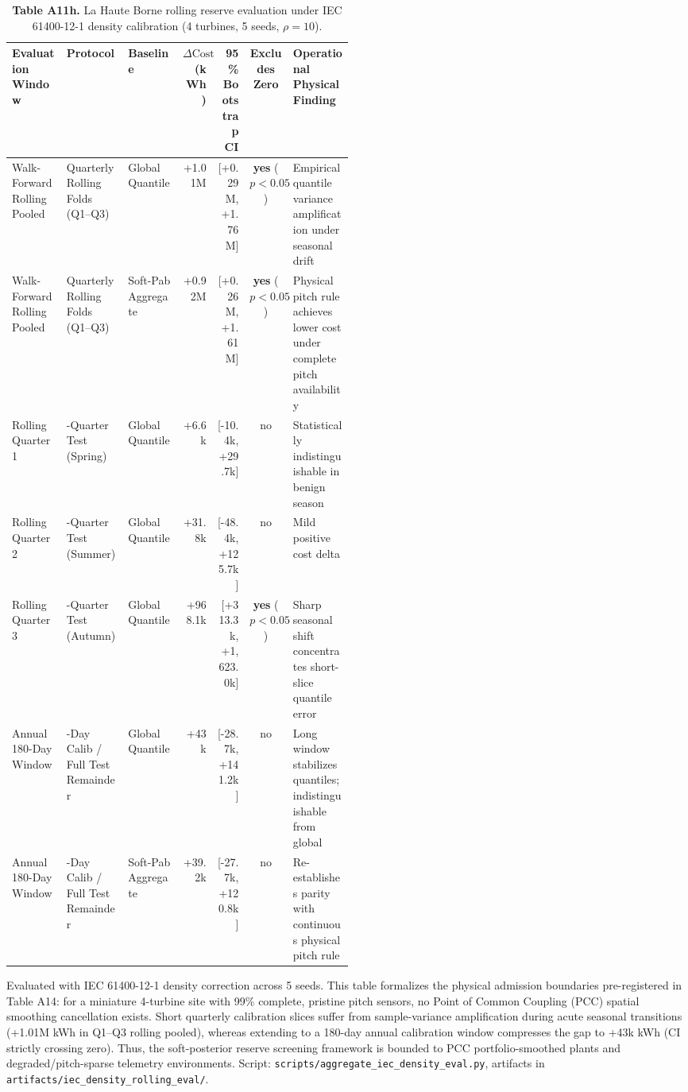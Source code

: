 \documentclass[
  journal]{IEEEtran}
\begin{document}
\begin{table}[!t]
\centering
\fontsize{8.0pt}{9.6pt}\selectfont
\setlength{\tabcolsep}{2.0pt}
\renewcommand{\arraystretch}{1.05}
\caption*{\textbf{Table A11h.} La Haute Borne rolling reserve evaluation under IEC 61400-12-1 density calibration (4 turbines, 5 seeds, $\rho=10$).}
%
\setlength{\tabcolsep}{3.5pt}
\begin{tabularx}{\linewidth}{>{\raggedright\arraybackslash}p{0.16\linewidth} >{\raggedright\arraybackslash}p{0.18\linewidth} >{\raggedright\arraybackslash}p{0.16\linewidth} r r c >{\raggedright\arraybackslash}X}
\toprule
Evaluation Window & Protocol & Baseline & $\Delta\text{Cost}$ (kWh) & 95\% Bootstrap CI & Excludes Zero & Operational Physical Finding \\
\midrule
Walk-Forward Rolling Pooled & Quarterly Rolling Folds (Q1--Q3) & Global Quantile & +1.01M & [+0.29M, +1.76M] & \textbf{yes} ($p < 0.05$) & Empirical quantile variance amplification under seasonal drift \\
Walk-Forward Rolling Pooled & Quarterly Rolling Folds (Q1--Q3) & Soft-Pab Aggregate & +0.92M & [+0.26M, +1.61M] & \textbf{yes} ($p < 0.05$) & Physical pitch rule achieves lower cost under complete pitch availability \\
Rolling Quarter 1 & 1-Quarter Test (Spring) & Global Quantile & +6.6k & [-10.4k, +29.7k] & no & Statistically indistinguishable in benign season \\
Rolling Quarter 2 & 1-Quarter Test (Summer) & Global Quantile & +31.8k & [-48.4k, +125.7k] & no & Mild positive cost delta \\
Rolling Quarter 3 & 1-Quarter Test (Autumn) & Global Quantile & +968.1k & [+313.3k, +1,623.0k] & \textbf{yes} ($p < 0.05$) & Sharp seasonal shift concentrates short-slice quantile error \\
\midrule
Annual 180-Day Window & 180-Day Calib / Full Test Remainder & Global Quantile & +43k & [-28.7k, +141.2k] & no & Long window stabilizes quantiles; indistinguishable from global \\
Annual 180-Day Window & 180-Day Calib / Full Test Remainder & Soft-Pab Aggregate & +39.2k & [-27.7k, +120.8k] & no & Re-establishes parity with continuous physical pitch rule \\
\bottomrule
\end{tabularx}\vspace{1mm}
\fontsize{8.0pt}{9.6pt}\selectfont Evaluated with IEC 61400-12-1 density correction across 5 seeds. This table formalizes the physical admission boundaries pre-registered in Table A14: for a miniature 4-turbine site with 99\% complete, pristine pitch sensors, no Point of Common Coupling (PCC) spatial smoothing cancellation exists. Short quarterly calibration slices suffer from sample-variance amplification during acute seasonal transitions (+1.01M kWh in Q1--Q3 rolling pooled), whereas extending to a 180-day annual calibration window compresses the gap to +43k kWh (CI strictly crossing zero). Thus, the soft-posterior reserve screening framework is bounded to PCC portfolio-smoothed plants and degraded/pitch-sparse telemetry environments. Script: \texttt{scripts/aggregate\_iec\_density\_eval.py}, artifacts in \texttt{artifacts/iec\_density\_rolling\_eval/}.

\end{table}
\end{document}
